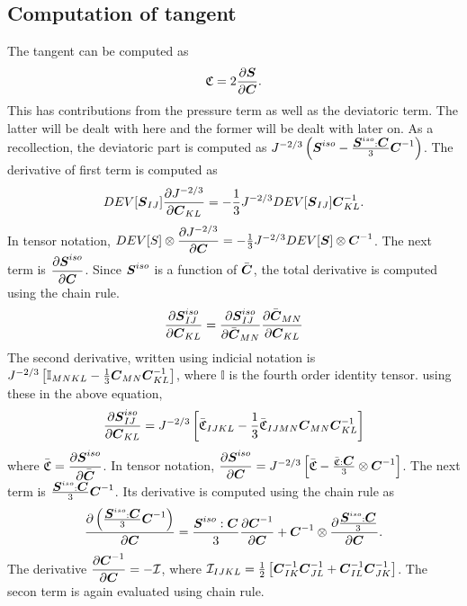 \documentclass[11pt,twoside,TimesRoman]{article}
\newcommand{\parder}[2]{{\dfrac{\partial #1}{\partial #2}}}
\begin{document}
\subsection{Computation of tangent}
The tangent can be computed as 
\begin{equation}
	\mathfrak{C} = 2 \parder{\bfS}{\bfC}.
\end{equation}
This has contributions from the pressure term as well as the deviatoric term. The latter will be dealt with here and the former will be dealt with later on. As a recollection, the deviatoric part is computed as $J^{-2/3} \left(\mbox{\boldmath $S$}^{iso}-\frac{\mbox{\boldmath $S$}^{iso}:\mbox{\boldmath $C$}}{3}\mbox{\boldmath $C$}^{-1} \right)$. The derivative of first term is computed as 
\begin{equation}
DEV[\bfS_{IJ}] \parder{J^{-2/3}}{\bfC_{KL}}= -\frac{1}{3} J^{-2/3} DEV[\bfS_{IJ}] {\bfC^{-1}_{KL}}.
\end{equation}
In tensor notation, $DEV[S] \otimes \parder{J^{-2/3}}{\bfC} = -\frac{1}{3} J^{-2/3} DEV[\bfS]  \otimes {\bfC^{-1}}$. The next term is $\parder{\bfS^{iso}}{\bfC}$. Since $\mbox{\boldmath $S$}^{iso}$ is a function of $\bar{\mbox{\boldmath $C$}}$, the total derivative is computed using the chain rule.
\begin{equation}
 \parder{\bfS^{iso}_{IJ}}{\bfC_{KL}} =  \parder{\bfS^{iso}_{IJ}}{\bar{\bfC}_{MN}} \parder{\bar{\bfC}_{MN}}{{\bfC}_{KL}}
\end{equation}
The second derivative, written using indicial notation is $J^{-2/3}\left[\mathbb{I}_{MNKL}- \frac{1}{3} \mbox{\boldmath $C$}_{MN} \mbox{\boldmath $C$}^{-1}_{KL}   \right]$, where $\mathbb{I}$ is the fourth order identity tensor. using these in the above equation,
\begin{equation}
\parder{\bfS^{iso}_{IJ}}{\bfC_{KL}} =  J^{-2/3}\left[\bar{\mathfrak{C}}_{IJKL}- \frac{1}{3} \bar{\mathfrak{C}}_{IJMN} \bfC_{MN} \bfC^{-1}_{KL} \right]  
\end{equation}
where $\bar{\mathfrak{C}} = \parder{\bfS^{iso}}{\bfCbar}$. In tensor notation, $\parder{\bfS^{iso}}{\bfC} = J^{-2/3}\left[\bar{\mathfrak{C}}- \frac{\bar{\mathfrak{C}}: \bfC}{3}  \otimes \bfC^{-1} \right]$. The next term is $\frac{\mbox{\boldmath $S$}^{iso}:\mbox{\boldmath $C$}}{3}\mbox{\boldmath $C$}^{-1}$. Its derivative is computed using the chain rule as
\begin{equation}
	\parder{\left( \frac{\bfS^{iso}:\bfC}{3}\bfC^{-1} \right)}{\bfC} = \frac{\bfS^{iso}:\bfC}{3} \parder{\bfCinv}{\bfC} + \bfCinv \otimes \parder{\frac{\bfS^{iso}:\bfC}{3}}{\bfC}.
\end{equation} 
The derivative $\parder{\bfCinv}{\bfC} = -\mathcal{I}$, where $\mathcal{I}_{IJKL} = \frac{1}{2} \left[ {\mbox{\boldmath $C$}}^{-1}_{IK} {\mbox{\boldmath $C$}}^{-1}_{JL} + {\mbox{\boldmath $C$}}^{-1}_{IL} {\mbox{\boldmath $C$}}^{-1}_{JK} \right] $. The secon term is again evaluated using chain rule.
\end{document}
